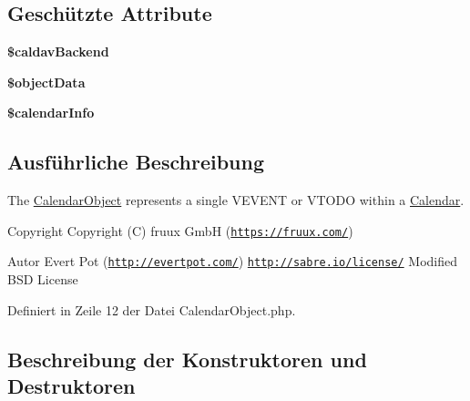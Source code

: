 \subsection*{Geschützte Attribute}
\begin{DoxyCompactItemize}
\item 
\mbox{\label{class_sabre_1_1_cal_d_a_v_1_1_calendar_object_a9803ac41a4d4eb5d034a625d3835aeef}} 
{\bfseries \$caldav\+Backend}
\item 
\mbox{\label{class_sabre_1_1_cal_d_a_v_1_1_calendar_object_af755d8b8944aef24c2ea342653402a8f}} 
{\bfseries \$object\+Data}
\item 
\mbox{\label{class_sabre_1_1_cal_d_a_v_1_1_calendar_object_af81a988de40c7382898315df5680f396}} 
{\bfseries \$calendar\+Info}
\end{DoxyCompactItemize}


\subsection{Ausführliche Beschreibung}
The \mbox{\hyperlink{class_sabre_1_1_cal_d_a_v_1_1_calendar_object}{Calendar\+Object}} represents a single V\+E\+V\+E\+NT or V\+T\+O\+DO within a \mbox{\hyperlink{class_sabre_1_1_cal_d_a_v_1_1_calendar}{Calendar}}.

\begin{DoxyCopyright}{Copyright}
Copyright (C) fruux GmbH (\href{https://fruux.com/}{\tt https\+://fruux.\+com/}) 
\end{DoxyCopyright}
\begin{DoxyAuthor}{Autor}
Evert Pot (\href{http://evertpot.com/}{\tt http\+://evertpot.\+com/})  \href{http://sabre.io/license/}{\tt http\+://sabre.\+io/license/} Modified B\+SD License 
\end{DoxyAuthor}


Definiert in Zeile 12 der Datei Calendar\+Object.\+php.



\subsection{Beschreibung der Konstruktoren und Destruktoren}
\mbox{\label{class_sabre_1_1_cal_d_a_v_1_1_calendar_object_a32c0aade32b1c0e4585965ef9f8378df}} 
